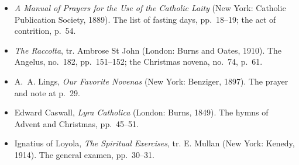 \begin{itemize}[leftmargin=1.3em, itemsep=0.3em]
\item \textit{A Manual of Prayers for the Use of the Catholic Laity} (New York: Catholic
Publication Society, 1889). The list of fasting days, pp.~18--19; the act of contrition, p.~54.
\item \textit{The Raccolta}, tr. Ambrose St John (London: Burns and Oates, 1910). The Angelus,
no.~182, pp.~151--152; the Christmas novena, no.~74, p.~61.
\item A.~A. Lings, \textit{Our Favorite Novenas} (New York: Benziger, 1897). The prayer and note at
p.~29.
\item Edward Caswall, \textit{Lyra Catholica} (London: Burns, 1849). The hymns of Advent and
Christmas, pp.~45--51.
\item Ignatius of Loyola, \textit{The Spiritual Exercises}, tr. E. Mullan (New York: Kenedy, 1914).
The general examen, pp.~30--31.
\end{itemize}
